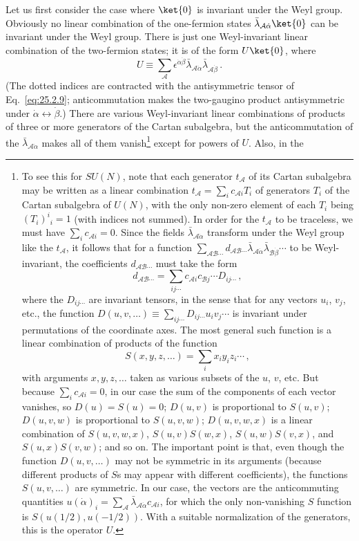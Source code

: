 Let us first consider the case where \(\ket{0}\) is invariant under the Weyl
group. Obviously no linear combination of the one-fermion states
\(\bar\lambda_{\mathcal A\dot\alpha}\ket{0}\) can be invariant under the
Weyl group.
There is just one Weyl-invariant linear combination of the two-fermion
states; it is of the form \(U\ket{0}\), where
\begin{equation}
  U\equiv
  \sum_{\mathcal A}
  \epsilon^{\dot\alpha\dot\beta}
  \bar\lambda_{\mathcal A\dot\alpha}
  \bar\lambda_{\mathcal A\dot\beta}\,.
  \tag{29.4.12}\label{eq:29.4.12}
\end{equation}
(The dotted indices are contracted with the antisymmetric tensor of
Eq.~\eqref{eq:25.2.9}; anticommutation makes the two-gaugino product
antisymmetric under
\(\dot\alpha\leftrightarrow\dot\beta\).) There are various
Weyl-invariant linear combinations of
products of three or more generators of the Cartan subalgebra, but the
anticommutation of the \(\bar\lambda_{\mathcal A\dot\alpha}\) makes all of them
vanish\footnote{To see this for \(SU(N)\), note that each generator
\(t_{\mathcal A}\) of its Cartan subalgebra may be written as a linear
combination \(t_{\mathcal A}=\sum_i c_{\mathcal A i}T_i\) of generators
\(T_i\) of the Cartan subalgebra of \(U(N)\), with the only non-zero
element of each \(T_i\) being \((T_i)^i{}_i=1\) (with indices not summed).
In order for the \(t_{\mathcal A}\) to be traceless, we must have
\(\sum_i c_{\mathcal A i}=0\). Since the fields
\(\bar\lambda_{\mathcal A\dot\alpha}\) transform under the Weyl group like the
\(t_{\mathcal A}\), it follows that for a function
\(\sum_{\mathcal A\mathcal B\cdots}
d_{\mathcal A\mathcal B\cdots}
\bar\lambda_{\mathcal A\dot\alpha}
\bar\lambda_{\mathcal B\dot\beta}\cdots\)
to be
Weyl-invariant, the coefficients \(d_{\mathcal A\mathcal B\cdots}\) must
take the form
\[
  d_{\mathcal A\mathcal B\cdots}
  =
  \sum_{ij\cdots}
  c_{\mathcal A i}c_{\mathcal B j}\cdots D_{ij\cdots}\,,
\]
where the \(D_{ij\cdots}\) are invariant tensors, in the sense that for any
vectors \(u_i\), \(v_j\), etc., the function
\(D(u,v,\ldots)\equiv\sum_{ij\cdots}D_{ij\cdots}u_iv_j\cdots\) is
invariant under permutations of the coordinate axes. The most general such
function is a linear combination of products of the function
\[
  S(x,y,z,\ldots)=\sum_i x_i y_i z_i\cdots\,,
\]
with arguments \(x,y,z,\ldots\) taken as various subsets of the \(u\),
\(v\), etc. But because \(\sum_i c_{\mathcal A i}=0\), in our case the
sum of the components of each vector vanishes, so \(D(u)=S(u)=0\);
\(D(u,v)\) is proportional to \(S(u,v)\); \(D(u,v,w)\) is proportional to
\(S(u,v,w)\); \(D(u,v,w,x)\) is a linear combination of
\(S(u,v,w,x)\), \(S(u,v)S(w,x)\), \(S(u,w)S(v,x)\), and
\(S(u,x)S(v,w)\); and so on. The important point is that, even though the
function \(D(u,v,\ldots)\) may not be symmetric in its arguments (because
different products of \(S\)s may appear with different coefficients), the
functions \(S(u,v,\ldots)\) are symmetric. In our case, the vectors are
the anticommuting quantities
\(u(\dot\alpha)_i=\sum_{\mathcal A}
\bar\lambda_{\mathcal A\dot\alpha}c_{\mathcal A i}\),
for which the only non-vanishing \(S\) function is
\(S(u(1/2),u(-1/2))\). With a suitable normalization of the generators,
this is the operator \(U\).} except for powers of \(U\). Also, in the
